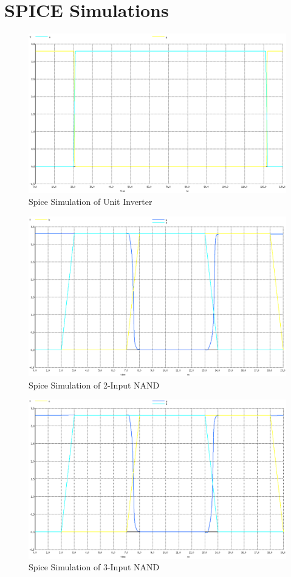\documentclass[12pt]{article}
\begin{document}
\section{SPICE Simulations}
\label{app:spice}

\begin{figure}[H]
	\centering
	\includegraphics[width=0.70\linewidth, keepaspectratio]{Graphics/1INV_spice}
	\caption{Spice Simulation of Unit Inverter}
	\label{fig:spice_INV}
\end{figure}

\begin{figure}[H]
	\centering
	\includegraphics[width=0.70\linewidth, keepaspectratio]{Graphics/2NAND_spice}
	\caption{Spice Simulation of 2-Input NAND}
	\label{fig:spice_2NAND}
\end{figure}

\begin{figure}[H]
	\centering
	\includegraphics[width=0.70\linewidth, keepaspectratio]{Graphics/3NAND_spice}
	\caption{Spice Simulation of 3-Input NAND}
	\label{fig:spice_3NAND}
\end{figure}
\end{document}
